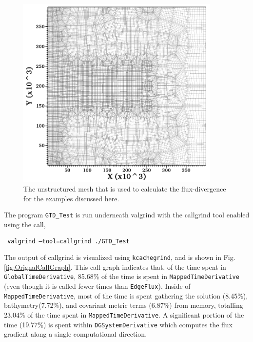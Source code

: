 \documentclass{softwaremanual}
\begin{document}
\begin{figure}
\begin{center}
\includegraphics[width=0.9\textwidth]{projectFigures/boxmesh.png}
\caption{The unstructured mesh that is used to calculate the flux-divergence for the examples discussed here.}\label{fig:boxmesh}
\end{center}
\end{figure}

The program \texttt{GTD\_Test} is run underneath valgrind with the callgrind tool enabled using the call,
\begin{center}
\texttt{ valgrind --tool=callgrind ./GTD\_Test }
\end{center}
The output of callgrind is visualized using \texttt{kcachegrind}, and is shown in Fig. \ref{fig:OrignalCallGraph}. This call-graph indicates that, of the time spent in \texttt{GlobalTimeDerivative}, 85.68\% of the time is spent in \texttt{MappedTimeDerivative} (even though it is called fewer times than \texttt{EdgeFlux}). Inside of \texttt{MappedTimeDerivative}, most of the time is spent gathering the solution (8.45\%), bathymetry(7.72\%), and covariant metric terms (6.87\%) from memory, totalling 23.04\% of the time spent in \texttt{MappedTimeDerivative}. A significant portion of the time (19.77\%) is spent within \texttt{DGSystemDerivative} which computes the flux gradient along a single computational direction.
\end{document}
